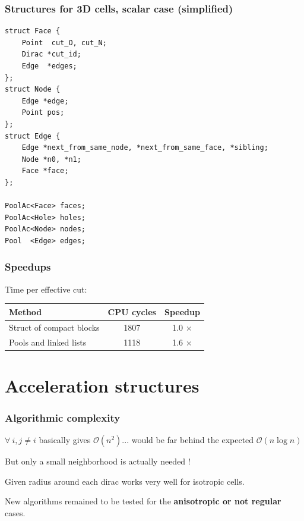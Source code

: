\documentclass[aspectratio=169]{beamer}
\begin{document}
\begin{frame}[fragile]
    \frametitle{Structures for 3D cells, scalar case (simplified)}

\begin{footnotesize}
\begin{lstlisting} 
struct Face {
    Point  cut_O, cut_N;
    Dirac *cut_id;
    Edge  *edges;    
};
struct Node {
    Edge *edge;
    Point pos;
};
struct Edge {
    Edge *next_from_same_node, *next_from_same_face, *sibling;
    Node *n0, *n1;  
    Face *face;
};

PoolAc<Face> faces;
PoolAc<Hole> holes;
PoolAc<Node> nodes;
Pool  <Edge> edges;
\end{lstlisting}
\end{footnotesize}
\end{frame}

\begin{frame}
    \frametitle{Speedups}

    Time per effective cut:

    \medskip
    \begin{center}    
    \begin{tabular}{|l|c|c|}
        \hline
        Method                   & CPU cycles & Speedup    \\
        \hline
        Struct of compact blocks & 1807        & 1.0 $\times$ \\
        Pools and linked lists   & 1118        & 1.6 $\times$ \\
        \hline
    \end{tabular}
    \end{center}
\end{frame}

\section{Acceleration structures}

\begin{frame}
    \frametitle{Algorithmic complexity}

    $\forall\ i, j \neq i $ basically gives $ \mathcal{O}( n^2 )$... would be far behind the 
      expected $\mathcal{O}( n \log{}n )$
    
    \vfill
    But only a small neighborhood is actually needed !

    \vfill
    Given radius around each dirac works very well for isotropic cells.
    
    \vfill
    New algorithms remained to be tested for the \textbf{anisotropic or not regular} cases.
\end{frame}
\end{document}
